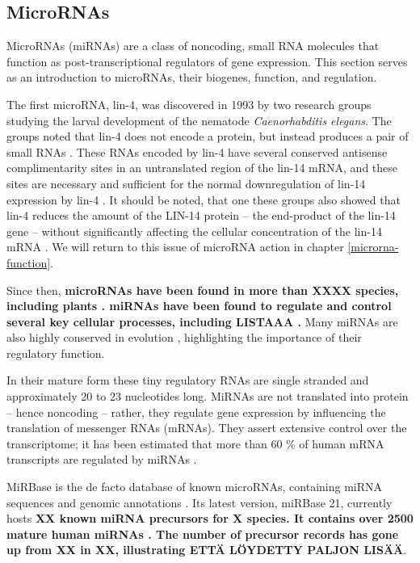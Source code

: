 \subsection{MicroRNAs}\label{micrornas}

MicroRNAs (miRNAs) are a class of noncoding, small RNA molecules that function
as post-transcriptional regulators of gene expression. This section serves as
an introduction to microRNAs, their biogenes, function, and regulation.

The first microRNA, lin-4, was discovered in 1993 by two research groups
studying the larval development of the nematode \emph{Caenorhabditis elegans}.
The groups noted that lin-4 does not encode a protein, but instead produces a
pair of small RNAs \citep{Lee1993}. These RNAs encoded by lin-4 have several
conserved antisense complimentarity sites in an untranslated region of the
lin-14 mRNA, and these sites are necessary and sufficient for the normal
downregulation of lin-14 expression by lin-4 \citep{Lee1993,Wightman1993}. It
should be noted, that one these groups also showed that lin-4 reduces the
amount of the LIN-14 protein -- the end-product of the lin-14 gene -- without
significantly affecting the cellular concentration of the lin-14 mRNA
\citep{??}. We will return to this issue of microRNA action in chapter
\ref{microrna-function}.

Since then,
\textbf{microRNAs have been found in more than XXXX species, including plants
\citep{CITE}. miRNAs have been found to regulate and control several key cellular
processes, including LISTAAA \citep{CITE}.} Many miRNAs are also highly
conserved in evolution \citep{Bartel2004}, highlighting the importance of their
regulatory function.

In their mature form these tiny regulatory RNAs are single stranded and
approximately 20 to 23 nucleotides long. MiRNAs are not translated into
protein -- hence noncoding -- rather, they regulate gene expression by
influencing the translation of messenger RNAs (mRNAs). They assert
extensive control over the transcriptome; it has been estimated that more
than 60 \% of human mRNA transcripts are regulated by miRNAs
\citep{CITE}.

MiRBase is the de facto database of known microRNAs, containing miRNA
sequences and genomic annotations \citep{CITE}. Its latest version, miRBase 21,
currently hosts \textbf{XX known miRNA precursors for X species. It contains
over 2500 mature human miRNAs \citep{CITE}. The number of precursor records has
gone up from XX in XX, illustrating ETTÄ LÖYDETTY PALJON LISÄÄ}.





